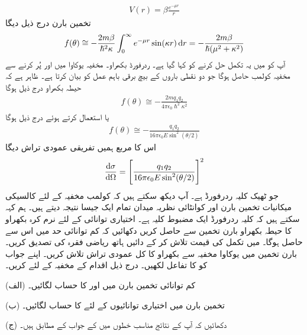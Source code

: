 \begin{align}
	V(r) = \beta\frac{e^{-\mu r}}{r}
\end{align}
تخمین بارن درج ذیل دیگا 
\begin{align}
	f(\theta)\cong-\frac{2m\beta}{\hslash^2\kappa}\int_{0}^{\infty}e^{-\mu r}\sin(\kappa r)\dif r=-\frac{2m\beta}{\hslash(\mu^2+\kappa^2)}
\end{align}
آپ کو  میں یہ تکمل حل کرنے کو کہا گیا ہے۔
ردرفورڈ بکھراو۔ مخفیہ یوکاوا میں  اور  پُر کرنے سے مخفیہ کولمب حاصل ہوگا جو دو نقطی باروں کے بیچ برقی باہم عمل کو بیان کرتا ہے۔ ظاہر ہے کہ حیطہ بکھراو درج ذیل ہوگا 
\begin{align}
	f(\theta)\cong-\frac{2mq_1q_2}{4\pi\epsilon_0\hslash^2\kappa^2}
\end{align}
یا  استعمال کرتے ہوئے درج ذیل ہوگا 
\begin{align}
	f(\theta)\cong-\frac{q_1q_2}{16\pi\epsilon_0E\sin^2(\theta/2)}
\end{align}
اس کا مربع ہمیں تفریقی عمودی تراش دیگا 
\begin{align}
	\frac{\dif\sigma}{\dif\Omega}=\left[\frac{q_1q_2}{16\pi\epsilon_0E\sin^2(\theta/2)}\right]^2
\end{align}
جو ٹھیک کلیہ ردرفورڈ  ہے۔ آپ دیکھ سکتے ہیں کہ کولمب مخفیہ کے لئے کالسیکی میکانیات تخمین بارن اور کوانٹائی نظریہ میدان تمام ایک  جیسا نتیجہ دیتے ہیں۔ ہم کہہ سکتے ہیں کہ کلیہ ردرفورڈ ایک مضبوط کلیہ ہے۔
اختیاری توانائی کے لئے نرم کرہ بکھراو کا حیطہ بکھراو بارن تخمین سے حاصل کریں دکھائیں کہ کم توانائی حد میں اس سے  حاصل ہوگا۔
 میں تکمل کی قیمت تلاش  کر کے دائیں ہاتھ ریاضی فقرہ  کی تصدیق کریں۔
بارن تخمین میں یوکاوا مخفیہ سے بکھراو کا کل عمودی تراش تلاش کریں۔ اپنے جواب کو  کا تفاعل لکھیں۔
درج ذیل اقدام  کے مخفیہ کے لئے کریں۔

(الف) کم توانائی تخمین بارن میں  اور  کا حساب لگائیں۔

(ب) تخمین بارن میں اختیاری توانائیوں کے لئے  کا حساب لگائیں۔

(ج) دکھائیں کہ آپ کے نتائج مناسب خطوں میں  کے جواب کے مطابق ہیں۔



